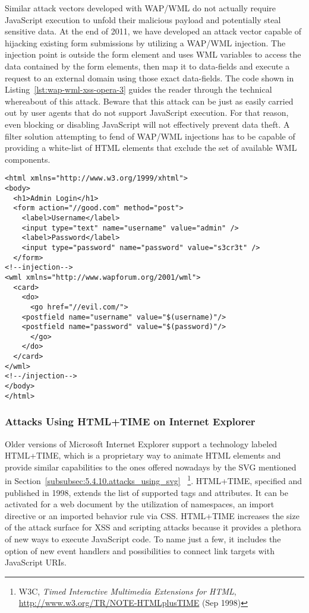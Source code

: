     Similar attack vectors developed with WAP/WML do not actually require JavaScript execution to unfold their malicious payload and potentially steal sensitive data. At the end of 2011, we have developed an attack vector capable of hijacking existing form submissions by utilizing a WAP/WML injection. The injection point is outside the form element and uses WML variables to access the data contained by the form elements, then map it to data-fields and execute a request to an external domain using those exact data-fields. The code shown in Listing~\ref{lst:wap-wml-xss-opera-3} guides the reader through the technical whereabout of this attack. Beware that this attack can be just as easily carried out by user agents that do not support JavaScript execution. For that reason, even blocking or disabling JavaScript will not effectively prevent data theft. A filter solution attempting to fend of WAP/WML injections has to be capable of providing a white-list of HTML elements that exclude the set of available WML 
components.

\begin{lstlisting}[captionpos=b,label=lst:wap-wml-xss-opera-3,caption=Stealing form element content via injected WAP/WML]
<html xmlns="http://www.w3.org/1999/xhtml">
<body>
  <h1>Admin Login</h1>
  <form action="//good.com" method="post">
    <label>Username</label>
    <input type="text" name="username" value="admin" />
    <label>Password</label>
    <input type="password" name="password" value="s3cr3t" />
  </form>
<!--injection-->	
<wml xmlns="http://www.wapforum.org/2001/wml">
  <card>
    <do>
      <go href="//evil.com/">
	<postfield name="username" value="$(username)"/>
	<postfield name="password" value="$(password)"/>	
      </go>
    </do>
  </card>
</wml>
<!--/injection-->	
</body>
</html>
\end{lstlisting}

    \subsubsection{Attacks Using HTML+TIME on Internet Explorer}
    \label{subsubsec:5.4.13.2.attacks_using_htmltime_code_on_ie}

    Older versions of Microsoft Internet Explorer support a technology labeled HTML+TIME, which is a proprietary way to animate HTML elements and provide similar capabilities to the ones offered nowadays by the SVG mentioned in Section~\ref{subsubsec:5.4.10.attacks_using_svg} ~\footnote{W3C, \textit{Timed Interactive Multimedia Extensions for HTML}, \url{http://www.w3.org/TR/NOTE-HTMLplusTIME} (Sep 1998)}. HTML+TIME, specified and published in 1998, extends the list of supported tags and attributes. It can be activated for a web document by the utilization of namespaces, an import directive or an imported behavior rule via CSS. HTML+TIME increases the size of the attack surface for XSS and scripting attacks because it provides a plethora of new ways to execute JavaScript code. To name just a few, it includes the option of new event handlers and possibilities to connect link targets with JavaScript URIs. \\

